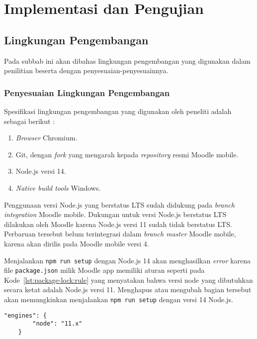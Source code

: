 \chapter{Implementasi dan Pengujian}

\section{Lingkungan Pengembangan}
Pada subbab ini akan dibahas lingkungan pengembangan yang digunakan dalam penilitian beserta dengan penyesuaian-penyesuainnya.
\subsection{Penyesuaian Lingkungan Pengembangan}
Spesifikasi lingkungan pengembangan yang digunakan oleh peneliti adalah sebagai berikut :

\begin{enumerate}
	\item \textit{Browser} Chromium.
	\item Git, dengan \textit{fork} yang mengarah kepada \textit{repository} resmi Moodle mobile.
	\item Node.js versi 14.
	\item \textit{Native build tools} Windows.
\end{enumerate} 

Penggunaan versi Node.js yang berstatus LTS sudah didukung pada \textit{branch integration} Moodle mobile. Dukungan untuk versi Node.js berstatus LTS dilakukan oleh Moodle karena Node.js versi 11 sudah tidak berstatus LTS. Perbaruan tersebut belum terintegrasi dalam \textit{branch master} Moodle mobile, karena akan dirilis pada Moodle mobile versi 4. \cite{MoodleTracker:Node11+} 

Menjalankan \texttt{npm run setup} dengan Node.js 14 akan menghasilkan \textit{error} karena file \texttt{package.json} milik Moodle app memiliki aturan seperti pada \mbox{Kode \ref{lst:package-lock:rule}} yang menyatakan bahwa versi node yang dibutuhkan secara ketat adalah Node.js versi 11. Menghapus atau mengubah bagian tersebut akan memungkinkan menjalankan \texttt{npm run setup} dengan versi 14 Node.js. 

\begin{lstlisting}[frame=single, label ={lst:package-lock:rule}, caption = Aturan pada \texttt{package-lock.json} ]
	"engines": {
    	"node": "11.x"
  	}
\end{lstlisting}

